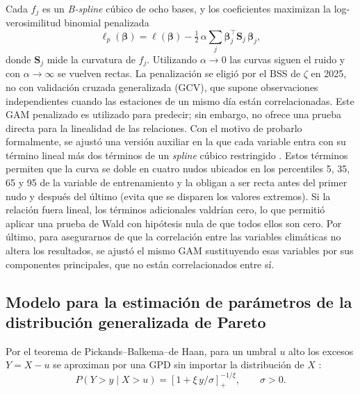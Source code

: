 \documentclass[11pt]{article}
\begin{document}
Cada $f_j$ es un \textit{B-spline} cúbico de ocho bases, y los coeficientes maximizan la log-verosimilitud binomial penalizada
\begin{equation}
\ell_p(\boldsymbol{\beta}) = \ell(\boldsymbol{\beta}) - \tfrac{1}{2}\,\alpha\textstyle\sum_{j}\boldsymbol{\beta}_j^{\top}\mathbf{S}_j\,\boldsymbol{\beta}_j ,
\label{eq:penalizada}
\end{equation}
donde $\mathbf{S}_j$ mide la curvatura de $f_j$. Utilizando $\alpha\to0$ las curvas siguen el ruido y con $\alpha\to\infty$ se vuelven rectas. La penalización se eligió por el BSS de $\zeta$ en 2025, no con validación cruzada generalizada (GCV), que supone observaciones independientes cuando las estaciones de un mismo día están correlacionadas. Este GAM penalizado es utilizado para predecir; sin embargo, no ofrece una prueba directa para la linealidad de las relaciones. Con el motivo de probarlo formalmente, se ajustó una versión auxiliar en la que cada variable entra con su término lineal más dos términos de un \textit{spline} cúbico restringido \citep{harrell2015}. Estos términos permiten que la curva se doble en cuatro nudos ubicados en los percentiles 5, 35, 65 y 95 de la variable de entrenamiento y la obligan a ser recta antes del primer nudo y después del último (evita que se disparen los valores extremos). Si la relación fuera lineal, los términos adicionales valdrían cero, lo que permitió aplicar una prueba de Wald con hipótesis nula de que todos ellos son cero. Por último, para asegurarnos de que la correlación entre las variables climáticas no altera los resultados, se ajustó el mismo GAM sustituyendo esas variables por sus componentes principales, que no están correlacionados entre sí.


\subsection{Modelo para la estimación de parámetros de la distribución generalizada de Pareto}
\label{sec:mod-gpd}

Por el teorema de Pickands--Balkema--de Haan, para un umbral $u$ alto los excesos $Y= X-u$ se aproximan por una GPD sin importar la distribución de $X$ \citep{coles2001}:
\begin{equation}
P(Y > y \mid X > u) = \left[1 + \xi\,y/\sigma\right]_{+}^{-1/\xi}, \qquad \sigma>0 .
\label{eq:gpd}
\end{equation}
\end{document}
